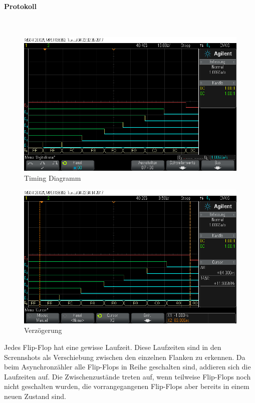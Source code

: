 \documentclass[10pt]{scrreprt}
\begin{document}
    \paragraph{Protokoll}
    $ $
    \begin{figure}[H]
        \includegraphics[width=\textwidth]{scope_3.png}
        \caption{Timing Diagramm}
    \end{figure}
    \begin{figure}[H]
        \includegraphics[width=\textwidth]{scope_4.png}
        \caption{Verzögerung}
        \label{fig:gesLaufzeit}
    \end{figure}

    Jedes Flip-Flop hat eine gewisse Laufzeit. Diese Laufzeiten sind in den Scrennshots
    als Verschiebung zwischen den einzelnen Flanken zu erkennen.
    Da beim Asynchronzähler alle Flip-Flops in Reihe geschalten sind, addieren
    sich die Laufzeiten auf. Die Zwischenzustände treten auf, wenn teilweise
    Flip-Flops noch nicht geschalten wurden, die vorrangegangenen Flip-Flops aber
    bereits in einem neuen Zustand sind.
\end{document}
